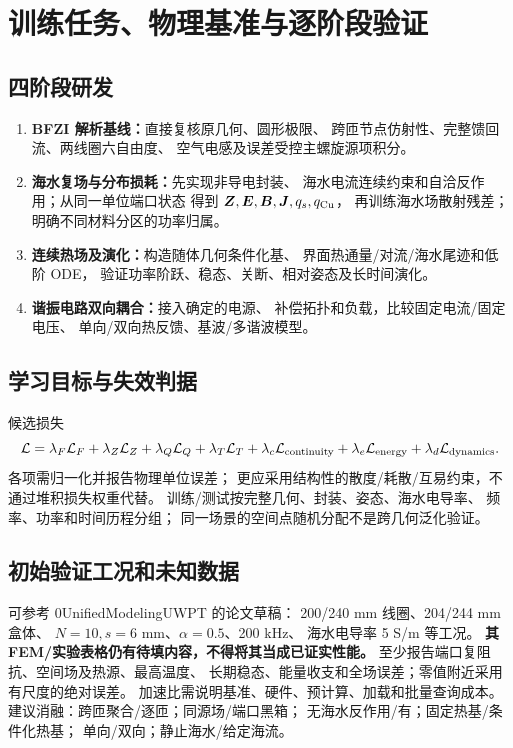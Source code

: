 \section{训练任务、物理基准与逐阶段验证}\label{sec:training}
\subsection{四阶段研发}
\begin{enumerate}
\item \textbf{BFZI 解析基线：}直接复核原几何、圆形极限、
跨匝节点仿射性、完整馈回流、两线圈六自由度、
空气电感及误差受控主螺旋源项积分。
\item \textbf{海水复场与分布损耗：}先实现非导电封装、
海水电流连续约束和自洽反作用；从同一单位端口状态
得到 \(\bm Z,\bm E,\bm B,\bm J,q_s,q_{\rm Cu}\)，
再训练海水场散射残差；明确不同材料分区的功率归属。
\item \textbf{连续热场及演化：}构造随体几何条件化基、
界面热通量/对流/海水尾迹和低阶 ODE，
验证功率阶跃、稳态、关断、相对姿态及长时间演化。
\item \textbf{谐振电路双向耦合：}接入确定的电源、
补偿拓扑和负载，比较固定电流/固定电压、
单向/双向热反馈、基波/多谐波模型。
\end{enumerate}
\subsection{学习目标与失效判据}
候选损失
\[
\mathcal L=\lambda_F\mathcal L_F+\lambda_Z\mathcal L_Z+
\lambda_Q\mathcal L_Q+\lambda_T\mathcal L_T+
\lambda_c\mathcal L_{\rm continuity}+
\lambda_e\mathcal L_{\rm energy}+
\lambda_d\mathcal L_{\rm dynamics}.
\]
各项需归一化并报告物理单位误差；
更应采用结构性的散度/耗散/互易约束，不通过堆积损失权重代替。
训练/测试按完整几何、封装、姿态、海水电导率、
频率、功率和时间历程分组；
同一场景的空间点随机分配不是跨几何泛化验证。

\subsection{初始验证工况和未知数据}
可参考 0UnifiedModelingUWPT 的论文草稿：
200/240 mm 线圈、204/244 mm 盒体、
\(N=10,s=6\) mm、\(\alpha=0.5\)、200 kHz、
海水电导率 5 S/m 等工况。
\textbf{其 FEM/实验表格仍有待填内容，不得将其当成已证实性能。}
至少报告端口复阻抗、空间场及热源、最高温度、
长期稳态、能量收支和全场误差；零值附近采用有尺度的绝对误差。
加速比需说明基准、硬件、预计算、加载和批量查询成本。
建议消融：跨匝聚合/逐匝；同源场/端口黑箱；
无海水反作用/有；固定热基/条件化热基；
单向/双向；静止海水/给定海流。
